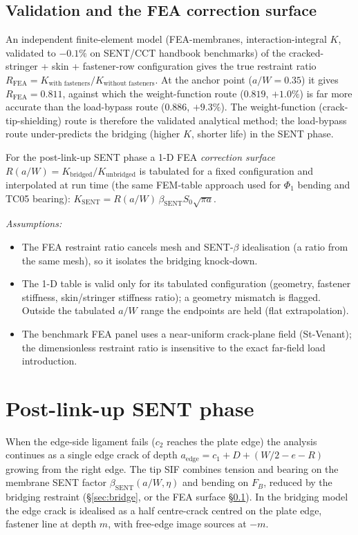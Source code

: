 \documentclass[11pt]{article}
\newenvironment{assume}{\par\smallskip\noindent\textit{Assumptions:}\begin{itemize}[leftmargin=1.5em,topsep=2pt,itemsep=1pt]}{\end{itemize}\par\smallskip}
\begin{document}
\subsection{Validation and the FEA correction surface}
\label{sec:fea}
An independent finite-element model (FEA-membranes, interaction-integral $K$,
validated to $-0.1\%$ on SENT/CCT handbook benchmarks) of the cracked-stringer +
skin + fastener-row configuration gives the true restraint ratio
$R_{\text{FEA}}=K_{\text{with fasteners}}/K_{\text{without fasteners}}$. At the
anchor point ($a/W=0.35$) it gives $R_{\text{FEA}}=0.811$, against which the
weight-function route ($0.819$, $+1.0\%$) is far more accurate than the load-bypass
route ($0.886$, $+9.3\%$). The weight-function (crack-tip-shielding) route is
therefore the validated analytical method; the load-bypass route under-predicts
the bridging (higher $K$, shorter life) in the SENT phase.

For the post-link-up SENT phase a 1-D FEA \emph{correction surface}
$R(a/W)=K_{\text{bridged}}/K_{\text{unbridged}}$ is tabulated for a fixed
configuration and interpolated at run time (the same FEM-table approach used for
$\Phi_1$ bending and TC05 bearing): $K_{\text{SENT}}=R(a/W)\,\beta_{\text{SENT}}
S_0\sqrt{\pi a}$.
\begin{assume}
\item The FEA restraint ratio cancels mesh and SENT-$\beta$ idealisation (a
  ratio from the same mesh), so it isolates the bridging knock-down.
\item The 1-D table is valid only for its tabulated configuration (geometry,
  fastener stiffness, skin/stringer stiffness ratio); a geometry mismatch is
  flagged. Outside the tabulated $a/W$ range the endpoints are held (flat
  extrapolation).
\item The benchmark FEA panel uses a near-uniform crack-plane field (St-Venant);
  the dimensionless restraint ratio is insensitive to the exact far-field load
  introduction.
\end{assume}

\section{Post-link-up SENT phase}
When the edge-side ligament fails ($c_2$ reaches the plate edge) the analysis
continues as a single edge crack of depth $a_{\text{edge}}=c_1+D+(W/2-e-R)$
growing from the right edge. The tip SIF combines tension and bearing on the
membrane SENT factor $\beta_{\text{SENT}}(a/W,\eta)$ and bending on $F_B$,
reduced by the bridging restraint (\S\ref{sec:bridge}, or the FEA surface
\S\ref{sec:fea}). In the bridging model the edge crack is idealised as a half
centre-crack centred on the plate edge, fastener line at depth $m$, with
free-edge image sources at $-m$.
\end{document}
